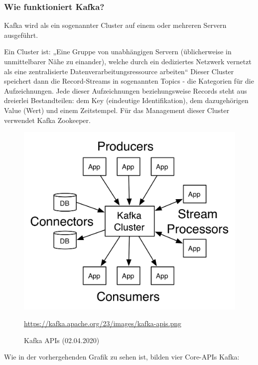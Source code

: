 \subsubsection{Wie funktioniert Kafka?}
Kafka wird als ein sogenannter Cluster auf einem oder mehreren Servern ausgeführt. 
\vspace{5mm}\par
Ein Cluster ist: „Eine Gruppe von unabhängigen Servern (üblicherweise in unmittelbarer Nähe zu einander), welche durch ein dediziertes Netzwerk vernetzt als eine zentralisierte Datenverarbeitungsressource arbeiten“
\cite{Cluster-Definition}
\newpage
Dieser Cluster speichert dann die Record-Streams in sogenannten Topics - die Kategorien für die Aufzeichnungen. Jede dieser Aufzeichnungen beziehungsweise Records steht aus dreierlei Bestandteilen: dem Key (eindeutige Identifikation), dem dazugehörigen Value (Wert) und einem Zeitstempel. Für das Management dieser Cluster verwendet Kafka Zookeeper.
\begin{figure}[H]
    \centering
    \includegraphics[scale=1.5]{images/kafka-apis.png}
    \caption{Kafka APIs (02.04.2020)}
    \url{https://kafka.apache.org/23/images/kafka-apis.png}
\end{figure}
Wie in der vorhergehenden Grafik zu sehen ist, bilden vier Core-APIs Kafka:
